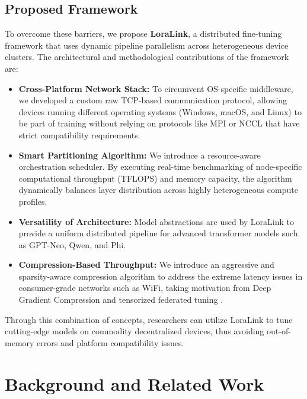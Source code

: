 \documentclass{ieeeaccess}
\begin{document}
\subsection{Proposed Framework}
To overcome these barriers, we propose \textbf{LoraLink}, a distributed fine-tuning framework that uses dynamic pipeline parallelism across heterogeneous device clusters. The architectural and methodological contributions of the framework are:

\begin{itemize}
    \item \textbf{Cross-Platform Network Stack:} To circumvent OS-specific middleware, we developed a custom raw TCP-based communication protocol, allowing devices running different operating systems (Windows, macOS, and Linux) to be part of training without relying on protocols like MPI or NCCL that have strict compatibility requirements.
    \item \textbf{Smart Partitioning Algorithm:} We introduce a resource-aware orchestration scheduler. By executing real-time benchmarking of node-specific computational throughput (TFLOPS) and memory capacity, the algorithm dynamically balances layer distribution across highly heterogeneous compute profiles.
    \item \textbf{Versatility of Architecture:} Model abstractions are used by LoraLink to provide a uniform distributed pipeline for advanced transformer models such as GPT-Neo, Qwen, and Phi.
    \item \textbf{Compression-Based Throughput:} We introduce an aggressive and sparsity-aware compression algorithm to address the extreme latency issues in consumer-grade networks such as WiFi, taking motivation from Deep Gradient Compression \cite{lin2018deep} and tensorized federated tuning \cite{ghiasvand2024communication}.
\end{itemize}

Through this combination of concepts, researchers can utilize LoraLink to tune cutting-edge models on commodity decentralized devices, thus avoiding out-of-memory errors and platform compatibility issues.

\section{Background and Related Work}
\end{document}
